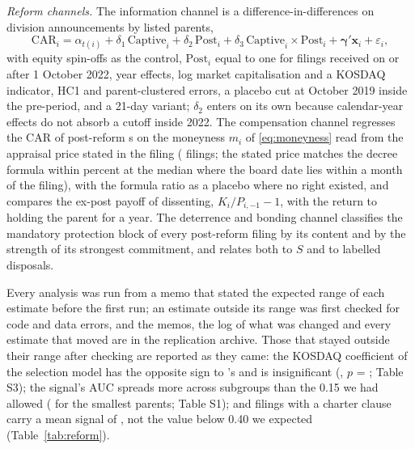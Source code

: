 \emph{Reform channels.} The information channel is a difference-in-differences on division announcements by listed parents,
\begin{equation}\label{eq:did}
\mathrm{CAR}_i = \alpha_{t(i)} + \delta_1\, \mathrm{Captive}_i + \delta_2\, \mathrm{Post}_i + \delta_3\, \mathrm{Captive}_i \times \mathrm{Post}_i + \boldsymbol{\gamma}'\mathbf{x}_i + \varepsilon_i ,
\end{equation}
with equity spin-offs as the control, $\mathrm{Post}_i$ equal to one for filings received on or after 1 October 2022, year effects, log market capitalisation and a KOSDAQ indicator, HC1 and parent-clustered errors, a placebo cut at October 2019 inside the pre-period, and a 21-day variant; $\delta_2$ enters on its own because calendar-year effects do not absorb a cutoff inside 2022. The compensation channel regresses the CAR of post-reform \captive{}s on the moneyness $m_i$ of \eqref{eq:moneyness} read from the appraisal price stated in the filing (\AppraisalPrices{} filings; the stated price matches the decree formula within \AppraisalProxyDiff{} percent at the median where the board date lies within a month of the filing), with the formula ratio as a placebo where no right existed, and compares the ex-post payoff of dissenting, $K_i / P_{i,-1} - 1$, with the return to holding the parent for a year. The deterrence and bonding channel classifies the mandatory protection block of every post-reform filing by its content and by the strength of its strongest commitment, and relates both to $S$ and to labelled disposals.

Every analysis was run from a memo that stated the expected range of each estimate before the first run; an estimate outside its range was first checked for code and data errors, and the memos, the log of what was changed and every estimate that moved are in the replication archive. Those that stayed outside their range after checking are reported as they came: the KOSDAQ coefficient of the selection model has the opposite sign to 's and is insignificant (\SelKosdaq{}, $p$ = \SelKosdaqP{}; Table S3); the signal's AUC spreads more across subgroups than the 0.15 we had allowed (\ValAUCSizeSmall{} for the smallest parents; Table S1); and filings with a charter clause carry a mean signal of \ProtMeanSCharter{}, not the value below 0.40 we expected (Table~\ref{tab:reform}).

